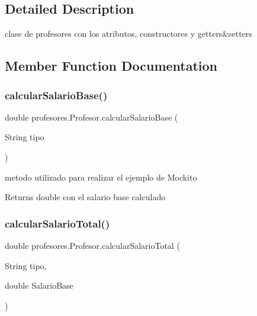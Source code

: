 \subsection{Detailed Description}
clase de profesores con los atributos, constructores y getters\&setters 

\subsection{Member Function Documentation}
\mbox{\label{classprofesores_1_1_profesor_a3aec8bbbefe797e12211f3bac7cb859a}} 
\subsubsection{\texorpdfstring{calcular\+Salario\+Base()}{calcularSalarioBase()}}
{\footnotesize\ttfamily double profesores.\+Profesor.\+calcular\+Salario\+Base (\begin{DoxyParamCaption}\item[{String}]{tipo }\end{DoxyParamCaption})}

metodo utilizado para realizar el ejemplo de Mockito \begin{DoxyReturn}{Returns}
double con el salario base calculado 
\end{DoxyReturn}
\mbox{\label{classprofesores_1_1_profesor_a327b9cf03989d19961cdd2ecef3f7f0f}} 
\subsubsection{\texorpdfstring{calcular\+Salario\+Total()}{calcularSalarioTotal()}}
{\footnotesize\ttfamily double profesores.\+Profesor.\+calcular\+Salario\+Total (\begin{DoxyParamCaption}\item[{String}]{tipo,  }\item[{double}]{Salario\+Base }\end{DoxyParamCaption})}

